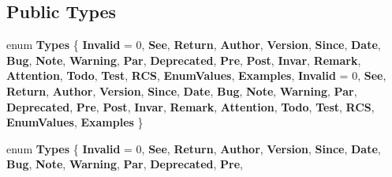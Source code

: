 \subsection*{Public Types}
\begin{DoxyCompactItemize}
\item 
\mbox{\label{class_i_doc_simple_sect_a937e664f1a8721d79fa0d41f79845a3c}} 
enum {\bfseries Types} \{ \newline
{\bfseries Invalid} = 0, 
{\bfseries See}, 
{\bfseries Return}, 
{\bfseries Author}, 
\newline
{\bfseries Version}, 
{\bfseries Since}, 
{\bfseries Date}, 
{\bfseries Bug}, 
\newline
{\bfseries Note}, 
{\bfseries Warning}, 
{\bfseries Par}, 
{\bfseries Deprecated}, 
\newline
{\bfseries Pre}, 
{\bfseries Post}, 
{\bfseries Invar}, 
{\bfseries Remark}, 
\newline
{\bfseries Attention}, 
{\bfseries Todo}, 
{\bfseries Test}, 
{\bfseries R\+CS}, 
\newline
{\bfseries Enum\+Values}, 
{\bfseries Examples}, 
{\bfseries Invalid} = 0, 
{\bfseries See}, 
\newline
{\bfseries Return}, 
{\bfseries Author}, 
{\bfseries Version}, 
{\bfseries Since}, 
\newline
{\bfseries Date}, 
{\bfseries Bug}, 
{\bfseries Note}, 
{\bfseries Warning}, 
\newline
{\bfseries Par}, 
{\bfseries Deprecated}, 
{\bfseries Pre}, 
{\bfseries Post}, 
\newline
{\bfseries Invar}, 
{\bfseries Remark}, 
{\bfseries Attention}, 
{\bfseries Todo}, 
\newline
{\bfseries Test}, 
{\bfseries R\+CS}, 
{\bfseries Enum\+Values}, 
{\bfseries Examples}
 \}
\item 
\mbox{\label{class_i_doc_simple_sect_a937e664f1a8721d79fa0d41f79845a3c}} 
enum {\bfseries Types} \{ \newline
{\bfseries Invalid} = 0, 
{\bfseries See}, 
{\bfseries Return}, 
{\bfseries Author}, 
\newline
{\bfseries Version}, 
{\bfseries Since}, 
{\bfseries Date}, 
{\bfseries Bug}, 
\newline
{\bfseries Note}, 
{\bfseries Warning}, 
{\bfseries Par}, 
{\bfseries Deprecated}, 
\newline
{\bfseries Pre}, 

\end{DoxyCompactItemize}
